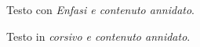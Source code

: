 \documentclass{article}
\begin{document}
Testo con \emph{Enfasi e contenuto \emph{annidato}}.

Testo in \textit{corsivo e contenuto \textit{annidato}}.
\end{document}
